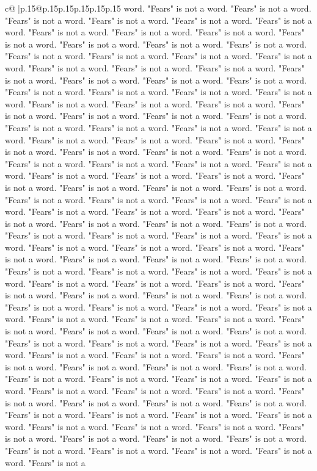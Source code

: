 \documentclass{article}
\begin{document}
{\begin{supertabular}{c@{$\;$}|p{.15\linewidth}@{}p{.15\linewidth}p{.15\linewidth}p{.15\linewidth}p{.15\linewidth}p{.15\linewidth}}
{{{word. "Fears" is not a word. "Fears" is not a word. "Fears" is not a word. "Fears" is not a word. "Fears" is not a word. "Fears" is not a word. "Fears" is not a word. "Fears" is not a word. "Fears" is not a word. "Fears" is not a word. "Fears" is not a word. "Fears" is not a word. "Fears" is not a word. "Fears" is not a word. "Fears" is not a word. "Fears" is not a word. "Fears" is not a word. "Fears" is not a word. "Fears" is not a word. "Fears" is not a word. "Fears" is not a word. "Fears" is not a word. "Fears" is not a word. "Fears" is not a word. "Fears" is not a word. "Fears" is not a word. "Fears" is not a word. "Fears" is not a word. "Fears" is not a word. "Fears" is not a word. "Fears" is not a word. "Fears" is not a word. "Fears" is not a word. "Fears" is not a word. "Fears" is not a word. "Fears" is not a word. "Fears" is not a word. "Fears" is not a word. "Fears" is not a word. "Fears" is not a word. "Fears" is not a word. "Fears" is not a word. "Fears" is not a word. "Fears" is not a word. "Fears" is not a word. "Fears" is not a word. "Fears" is not a word. "Fears" is not a word. "Fears" is not a word. "Fears" is not a word. "Fears" is not a word. "Fears" is not a word. "Fears" is not a word. "Fears" is not a word. "Fears" is not a word. "Fears" is not a word. "Fears" is not a word. "Fears" is not a word. "Fears" is not a word. "Fears" is not a word. "Fears" is not a word. "Fears" is not a word. "Fears" is not a word. "Fears" is not a word. "Fears" is not a word. "Fears" is not a word. "Fears" is not a word. "Fears" is not a word. "Fears" is not a word. "Fears" is not a word. "Fears" is not a word. "Fears" is not a word. "Fears" is not a word. "Fears" is not a word. "Fears" is not a word. "Fears" is not a word. "Fears" is not a word. "Fears" is not a word. "Fears" is not a word. "Fears" is not a word. "Fears" is not a word. "Fears" is not a word. "Fears" is not a word. "Fears" is not a word. "Fears" is not a word. "Fears" is not a word. "Fears" is not a word. "Fears" is not a word. "Fears" is not a word. "Fears" is not a word. "Fears" is not a word. "Fears" is not a word. "Fears" is not a word. "Fears" is not a word. "Fears" is not a word. "Fears" is not a word. "Fears" is not a word. "Fears" is not a word. "Fears" is not a word. "Fears" is not a word. "Fears" is not a word. "Fears" is not a word. "Fears" is not a word. "Fears" is not a word. "Fears" is not a word. "Fears" is not a word. "Fears" is not a word. "Fears" is not a word. "Fears" is not a word. "Fears" is not a word. "Fears" is not a word. "Fears" is not a word. "Fears" is not a word. "Fears" is not a word. "Fears" is not a word. "Fears" is not a word. "Fears" is not a word. "Fears" is not a word. "Fears" is not a word. "Fears" is not a word. "Fears" is not a word. "Fears" is not a word. "Fears" is not a word. "Fears" is not a word. "Fears" is not a word. "Fears" is not a word. "Fears" is not a word. "Fears" is not a word. "Fears" is not a word. "Fears" is not a word. "Fears" is not a word. "Fears" is not a word. "Fears" is not a word. "Fears" is not a word. "Fears" is not a word. "Fears" is not a word. "Fears" is not a word. "Fears" is not a word. "Fears" is not a }}}
\end{supertabular}}
\end{document}
